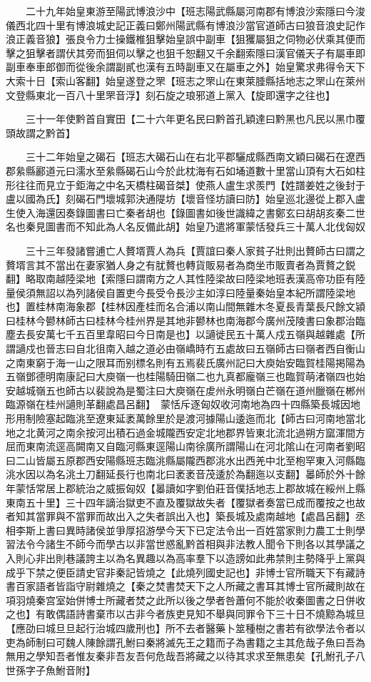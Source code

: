 　　二十九年始皇東游至陽武博浪沙中【班志陽武縣屬河南郡有博浪沙索隱曰今浚儀西北四十里有博浪城史記正義曰鄭州陽武縣有博浪沙當官道師古曰狼音浪史記作浪正義音狼】張良令力士操鐵椎狙擊始皇誤中副車【狙玃屬狙之伺物必伏乘其便而擊之狙擊者謂伏其旁而狙伺以擊之也狙千恕翻又千余翻索隱曰漢官儀天子有屬車即副車奉車郎御而從後余謂副貳也漢有五時副車又在屬車之外】始皇驚求弗得令天下大索十日【索山客翻】始皇遂登之罘【班志之罘山在東萊腄縣括地志之罘山在萊州文登縣東北一百八十里罘音浮】刻石旋之琅邪道上黨入【旋即還字之往也】

　　三十一年使黔首自實田【二十六年更名民曰黔首孔穎達曰黔黑也凡民以黑巾覆頭故謂之黔首】

　　三十二年始皇之碣石【班志大碣石山在右北平郡驪成縣西南文穎曰碣石在遼西郡絫縣酈道元曰濡水至絫縣碣石山今於此枕海有石如埇道數十里當山頂有大石如柱形往往而見立于鉅海之中名天橋柱碣音桀】使燕人盧生求羨門【姓譜姜姓之後封于盧以國為氏】刻碣石門壞城郭決通隄坊【壞音怪坊讀曰防】始皇巡北邊從上郡入盧生使入海還因奏錄圖書曰亡秦者胡也【錄圖書如後世識緯之書鄭玄曰胡胡亥秦二世名也秦見圖書而不知此為人名反備此胡】始皇乃遣將軍蒙恬發兵三十萬人北伐匈奴

　　三十三年發諸嘗逋亡人贅壻賈人為兵【賈誼曰秦人家貧子壯則出贅師古曰謂之贅壻言其不當出在妻家猶人身之有肬贅也轉貨販易者為商坐市販賣者為賈贅之鋭翻】略取南越陸梁地【索隱曰謂南方之人其性陸梁故曰陸梁地班表漢高帝功臣有陸量侯須無詔以為列諸侯自置吏今長受令長沙主如淳曰陸量秦始皇本紀所謂陸梁地也】置桂林南海象郡【桂林因產桂而名合浦以南山間無雜木冬夏長青葉長尺餘文潁曰桂林今鬰林師古曰桂林今桂州界是其地非鬰林也南海郡今廣州茂陵書曰象郡治臨塵去長安萬七千五百里韋昭曰今日南是也】以讁徙民五十萬人戍五嶺與越雜處【所謂讁戍也晉志曰自北徂南入越之道必由嶺嶠時冇五處故曰五嶺師古曰嶺者西自衡山之南東窮于海一山之限耳而别標名則有五焉裴氏廣州記曰大庾始安臨賀桂陽掲陽為五嶺鄧德明南康記曰大庾嶺一也桂陽騎田嶺二也九真都龐嶺三也臨賀萌渚嶺四也始安越城嶺五也師古以裴說為是蜀注曰大庾嶺在䖍州永明嶺白芒嶺在道州臘嶺在郴州臨源嶺在桂州讁則革翻處昌呂翻】　蒙恬斥逐匈奴收河南地為四十四縣築長城因地形用制險塞起臨洮至遼東延袤萬餘里於是渡河據陽山逶迤而北【師古曰河南地當北地之北黄河之南余按河出積石過金城隴西安定北地郡界皆東北流北過朔方窳渾間方屈而東南流逕高闕南又自臨河縣東逕陽山南徐廣所謂陽山在河北隂山在河南者劉昭曰二山皆屬五原郡西安陽縣班志臨洮縣屬隴西郡洮水出西羌中北至枹罕東入河縣臨洮水因以為名洮土刀翻延長行也南北曰袤袤音茂逶於為翻迤以支翻】㬥師於外十餘年蒙恬常居上郡統治之威振匈奴【㬥讀如字劉伯莊音僕括地志上郡故城在綏州上縣東南五十里】三十四年謫治獄吏不直及覆獄故失者【覆獄者奏當已成而覆按之也故者知其當罪與不當罪而故出入之失者誤出入也】築長城及處南越地【處昌呂翻】丞相李斯上書曰異時諸侯並爭厚招游學今天下已定法令出一百姓當家則力農工士則學習法令今諸生不師今而學古以非當世惑亂黔首相與非法教人聞令下則各以其學議之入則心非出則巷議誇主以為名異趣以為高率羣下以造謗如此弗禁則主勢降乎上黨與成乎下禁之便臣請史官非秦記皆燒之【此燒列國史記也】非博士官所職天下有藏詩書百家語者皆詣守尉雜燒之【秦之焚書焚天下之人所藏之書耳其博士官所藏則故在項羽燒秦宫室始併博士所藏者焚之此所以後之學者咎蕭何不能於收秦圖書之日併收之也】有敢偶語詩書棄市以古非今者族吏見知不舉與同罪令下三十日不燒黥為城旦【應劭曰城旦旦起行治城四歲刑也】所不去者醫藥卜筮種樹之書若有欲學法令者以吏為師制曰可魏人陳餘謂孔鮒曰秦將滅先王之籍而子為書籍之主其危哉子魚曰吾為無用之學知吾者惟友秦非吾友吾何危哉吾將藏之以待其求求至無患矣【孔鮒孔子八世孫字子魚鮒音附】

